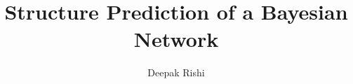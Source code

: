 \documentclass[]{article}
\title{Structure Prediction of a Bayesian Network}
\author{Deepak Rishi}
\begin{document}
\maketitle

\nocite{*}





\newpage


\end{document}
